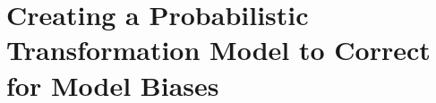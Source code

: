 %
\section{Creating a Probabilistic Transformation Model to Correct for Model Biases}
\label{sec:5_Transform}

%
